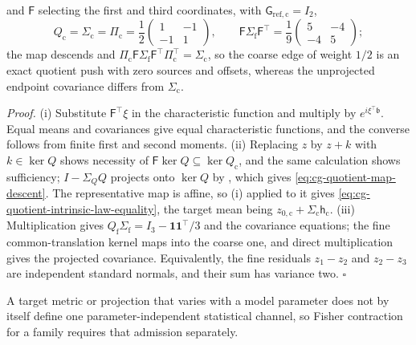 and \(\mathsf F\) selecting the first and third coordinates, with
\(\mathsf G_{\mathrm{ref,c}}=I_2\),
\begin{equation}
Q_{\mathrm c}=\Sigma_{\mathrm c}=\Pi_{\mathrm c}
=\frac12\begin{pmatrix}1&-1\\-1&1\end{pmatrix},\qquad
\mathsf F\Sigma_{\mathrm f}\mathsf F^\top
=\frac19\begin{pmatrix}5&-4\\-4&5\end{pmatrix};
\label{eq:cg-quotient-chain-push}
\end{equation}
the map descends and
\(\Pi_{\mathrm c}\mathsf F\Sigma_{\mathrm f}\mathsf F^\top\Pi_{\mathrm c}^\top=\Sigma_{\mathrm c}\),
so the coarse edge of weight \(1/2\) is an exact quotient push with zero sources
and offsets, whereas the unprojected endpoint covariance differs from
\(\Sigma_{\mathrm c}\). 

\noindent\emph{Proof.}
(i) Substitute \(\mathsf F^\top\xi\) in the characteristic function and multiply by
\(e^{i\xi^\top\mathfrak b}\). Equal means and covariances give equal
characteristic functions, and the converse follows from finite first and second
moments. (ii) Replacing \(z\) by \(z+k\) with \(k\in\ker Q\) shows necessity of
\(\mathsf F\ker Q\subseteq\ker Q_{\mathrm c}\), and the same calculation shows
sufficiency; \(I-\Sigma_QQ\) projects onto \(\ker Q\) by
, which gives
\eqref{eq:cg-quotient-map-descent}. The representative map is affine, so (i)
applied to it gives \eqref{eq:cg-quotient-intrinsic-law-equality}, the target
mean being \(z_{0,\mathrm c}+\Sigma_{\mathrm c}\mathsf h_{\mathrm c}\). (iii)
Multiplication gives \(Q_{\mathrm f}\Sigma_{\mathrm f}=I_3-\mathbf1\mathbf1^\top/3\)
and the covariance equations; the fine common-translation kernel maps into the
coarse one, and direct multiplication gives the projected covariance.
Equivalently, the fine residuals \(z_1-z_2\) and \(z_2-z_3\) are independent
standard normals, and their sum has variance two. \(\square\)

A target metric or projection that varies with a model parameter does not by
itself define one parameter-independent statistical channel, so Fisher
contraction for a family requires that admission separately.

